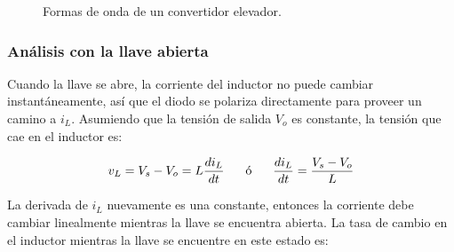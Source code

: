 \begin{figure}[hbt!]
    \centering
    \hspace{10mm}
    \hspace{10mm}
    \hspace{10mm}
    \caption{Formas de onda de un convertidor elevador.}
    \label{formas-onda-elevador}
\end{figure}

\subsubsection{Análisis con la llave abierta}

Cuando la llave se abre, la corriente del inductor no puede cambiar instantáneamente, así que el diodo se polariza directamente para proveer un camino a $i_L$. Asumiendo que la tensión de salida $V_o$ es constante, la tensión que cae en el inductor es:

\begin{equation}
    v_L = V_s - V_o = L \frac{di_L}{dt} \hspace{0.6cm} \textrm{ó} \hspace{0.6cm} \frac{di_L}{dt} = \frac{V_s - V_o}{L}
\end{equation}

La derivada de $i_L$ nuevamente es una constante, entonces la corriente debe cambiar linealmente mientras la llave se encuentra abierta. La tasa de cambio en el inductor  mientras la llave se encuentre en este estado es:

